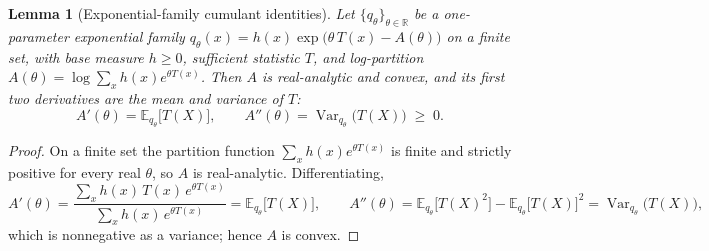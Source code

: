 \documentclass{article}
\newtheorem{lemma}{Lemma}
\DeclareMathOperator{\Var}{Var}
\newcommand{\E}{\mathbb{E}}
\newcommand{\R}{\mathbb{R}}
\begin{document}
\begin{lemma}[Exponential-family cumulant identities]
\label{lem:expfam}
Let $\{q_\theta\}_{\theta\in\R}$ be a one-parameter exponential family $q_\theta(x)=h(x)\exp\!\big(\theta\,T(x)-A(\theta)\big)$ on a finite set, with base measure $h\ge0$, sufficient statistic $T$, and log-partition $A(\theta)=\log\sum_x h(x)e^{\theta T(x)}$. Then $A$ is real-analytic and convex, and its first two derivatives are the mean and variance of $T$:
\begin{equation}
\label{eq:expfam-deriv}
A'(\theta)=\E_{q_\theta}\!\big[T(X)\big],
\qquad
A''(\theta)=\Var_{q_\theta}\!\big(T(X)\big)\;\ge\;0.
\end{equation}
\end{lemma}
\begin{proof}
On a finite set the partition function $\sum_x h(x)e^{\theta T(x)}$ is finite and strictly positive for every real $\theta$, so $A$ is real-analytic. Differentiating,
\[
A'(\theta)=\frac{\sum_x h(x)\,T(x)\,e^{\theta T(x)}}{\sum_x h(x)\,e^{\theta T(x)}}=\E_{q_\theta}\!\big[T(X)\big],
\qquad
A''(\theta)=\E_{q_\theta}\!\big[T(X)^2\big]-\E_{q_\theta}\!\big[T(X)\big]^2=\Var_{q_\theta}\!\big(T(X)\big),
\]
which is nonnegative as a variance; hence $A$ is convex.
\end{proof}
\end{document}
